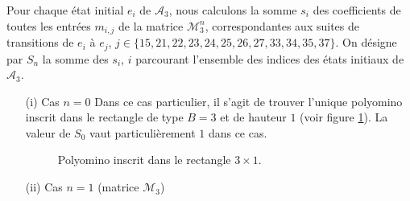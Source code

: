 Pour chaque état initial $e_{i}$ de $\mathcal{A}_{3}$, nous calculons la somme $s_{i}$ des coefficients de toutes les entrées $m_{i,j}$ de la matrice $\mathcal{M}_{3}^{n}$, correspondantes aux suites de transitions de $e_{i}$ à $e_{j}$, $j\in \{15, 21, 22, 23, 24, 25, 26, 27, 33, 34, 35, 37\}$. On désigne par  $S_{n}$ la somme des $s_{i}$, $i$ parcourant l'ensemble des indices des états initiaux de $\mathcal{A}_{3}$.
\begin{itemize}
\item[(i)] Cas $n=0$
Dans ce cas particulier, il s'agit de trouver l'unique polyomino inscrit dans le rectangle de type $B=3$ et de hauteur $1$ (voir figure \ref{uni3}). La valeur de $S_{0}$ vaut particulièrement $1$ dans ce cas.
 \begin{figure}[!htb]
 \begin{minipage}[c]{.26\linewidth}
  \centering
  \end{minipage}
  \hfill
\begin{minipage}[c]{.56\linewidth}
  \centering
\begin{logicpuzzle}[rows=1,columns=3,color=cyan!100, width=750px,scale=0.5]
\framepuzzle[black!50]
\end{logicpuzzle}
\end{minipage}
\caption{\label{uni3} Polyomino inscrit dans le rectangle $3\times 1$.}
\end{figure}
\item[(ii)] Cas $n=1$ (matrice $\mathcal{M}_{3}$)\\


\end{itemize}
